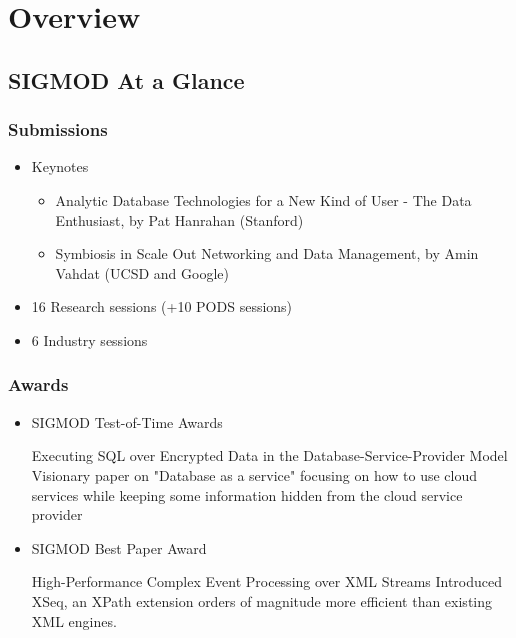 
\section{Overview} %

\subsection{SIGMOD At a Glance}
\begin{frame}[red] %
\frametitle{Submissions}

\begin{itemize} 
 \item Keynotes
      \begin{itemize} 
      \item Analytic Database Technologies for a New Kind of User - The Data Enthusiast, by Pat Hanrahan (Stanford)
      \item Symbiosis in Scale Out Networking and Data Management, by Amin Vahdat (UCSD and Google)
      \end{itemize}
 \item 16 Research sessions (+10 PODS sessions)

 \item 6 Industry sessions
\end{itemize}

\end{frame}


\begin{frame}[red] %
\frametitle{Awards}

      \begin{itemize} 
      \item SIGMOD Test-of-Time Awards
      \begin{itemize}
	\gitem Executing SQL over Encrypted Data in the Database-Service-Provider Model
	\ritem Visionary paper on "Database as a service" focusing on how to use cloud services while keeping some information hidden from the cloud service provider
      \end{itemize}
      \end{itemize}

      \begin{itemize} 
      \item SIGMOD Best Paper Award
      \begin{itemize}
	\gitem High-Performance Complex Event Processing over XML Streams
	\ritem Introduced XSeq, an XPath extension orders of magnitude more efficient than existing XML engines.
      \end{itemize}
      \end{itemize}

\end{frame}



